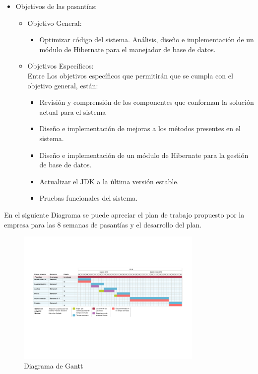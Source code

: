 \documentclass[spanish]{article}
\begin{document}
 \begin{itemize}
	
	\item Objetivos de las pasantías:	 
	\begin{itemize}
		\item Objetivo General:
		\begin{itemize}
			\item Optimizar código del sistema. Análisis, diseño e implementación de un módulo de Hibernate para el manejador de base de datos. 
		\end{itemize}
		\item Objetivos Específicos: \\
		Entre Los objetivos específicos que permitirán que se cumpla con el objetivo general, están:
		
		\begin{itemize}
			\item Revisión y comprensión de los componentes que conforman la solución actual para el sistema
			\item Diseño e implementación de mejoras a los métodos presentes en el sistema.
			\item Diseño e implementación de un módulo de Hibernate para la gestión de base de datos.
			\item Actualizar el JDK a la última versión estable.
			\item Pruebas funcionales del sistema.
		\end{itemize} 
	\end{itemize}
	 	 
\end{itemize}

En el siguiente Diagrama se puede apreciar el plan de trabajo propuesto por la empresa para las 8 semanas de pasantías y el desarrollo del plan.

\begin{figure}[htb]
	\centering
	\includegraphics[width=0.8\textwidth]{diagrama1.png}
	\caption{Diagrama de Gantt}
	\label{i1}
\end{figure}
\end{document}
